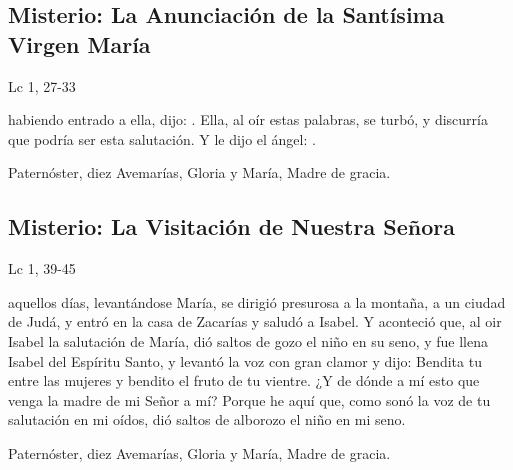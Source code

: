 \documentclass[10pt,a4paper,oneside]{book}
\newcounter{joyful-counter}
\begin{document}
\subsection*{ Misterio: La Anunciación de la Santísima Virgen María}
\begin{flushright}
      {\color{red}Lc 1, 27-33}
\end{flushright}
habiendo entrado a ella, dijo: . Ella, al oír estas palabras, se turbó,
y discurría que podría ser esta salutación. Y le dijo el ángel: .

\begin{center}
      Paternóster, diez Avemarías, Gloria y María, Madre de gracia.
\end{center}

\subsection*{ Misterio: La Visitación de Nuestra Señora}
\begin{flushright}
      {\color{red}Lc 1, 39-45}
\end{flushright}
 aquellos días, levantándose María, se dirigió presurosa a la montaña, a un ciudad de Judá, y entró en la casa de Zacarías y saludó a Isabel.
Y aconteció que, al oir Isabel la salutación de María, dió saltos de gozo el niño en su seno, y fue llena Isabel del Espíritu Santo, y levantó la voz con gran clamor y dijo:
Bendita tu entre las mujeres y bendito el fruto de tu vientre. ¿Y de dónde a mí esto que venga la madre de mi Señor a mí? Porque he aquí que, como sonó la voz de tu salutación en mi oídos,
dió saltos de alborozo el niño en mi seno.

\begin{center}
      Paternóster, diez Avemarías, Gloria y María, Madre de gracia.
\end{center}

\end{document}
